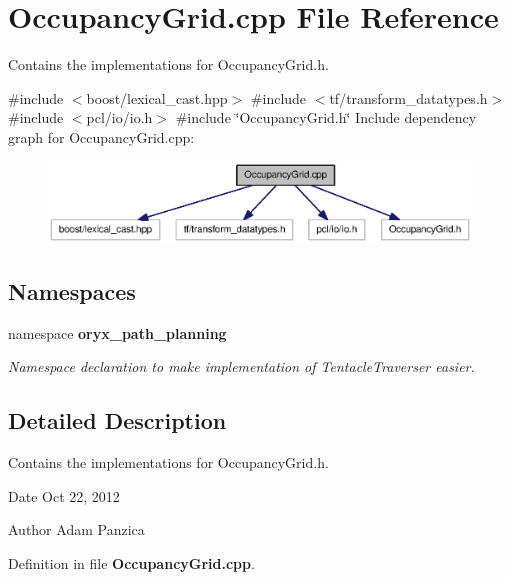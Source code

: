 \section{\-Occupancy\-Grid.\-cpp \-File \-Reference}
\label{OccupancyGrid_8cpp}


\-Contains the implementations for \-Occupancy\-Grid.\-h.  


{\ttfamily \#include $<$boost/lexical\-\_\-cast.\-hpp$>$}\*
{\ttfamily \#include $<$tf/transform\-\_\-datatypes.\-h$>$}\*
{\ttfamily \#include $<$pcl/io/io.\-h$>$}\*
{\ttfamily \#include \char`\"{}\-Occupancy\-Grid.\-h\char`\"{}}\*
\-Include dependency graph for \-Occupancy\-Grid.\-cpp\-:
\nopagebreak
\begin{figure}[H]
\begin{center}
\leavevmode
\includegraphics[width=350pt]{OccupancyGrid_8cpp__incl}
\end{center}
\end{figure}
\subsection*{\-Namespaces}
\begin{DoxyCompactItemize}
\item 
namespace {\bf oryx\-\_\-path\-\_\-planning}
\begin{DoxyCompactList}\small\item\em \-Namespace declaration to make implementation of \-Tentacle\-Traverser easier. \end{DoxyCompactList}\end{DoxyCompactItemize}


\subsection{\-Detailed \-Description}
\-Contains the implementations for \-Occupancy\-Grid.\-h. \begin{DoxyDate}{\-Date}
\-Oct 22, 2012 
\end{DoxyDate}
\begin{DoxyAuthor}{\-Author}
\-Adam \-Panzica 
\end{DoxyAuthor}


\-Definition in file {\bf \-Occupancy\-Grid.\-cpp}.

